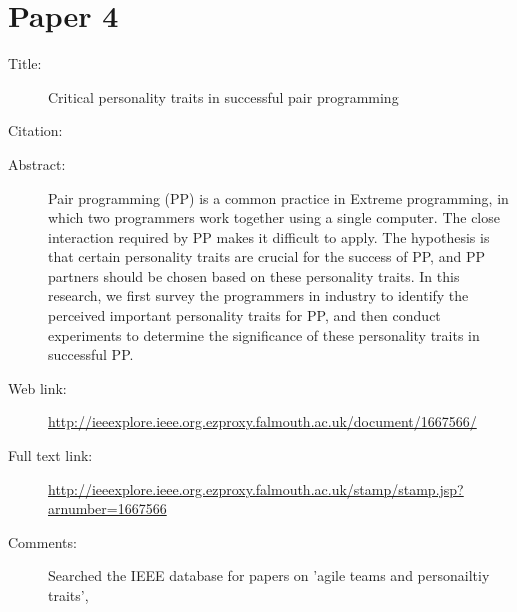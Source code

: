 \documentclass{scrartcl}
\begin{document}
\section*{Paper 4}
\begin{description}
\item[Title:] {Critical personality traits in successful pair programming}
\item[Citation:] \cite{Paper4}
\item[Abstract:]{ Pair programming (PP) is a common practice in Extreme programming, in which two programmers work together using a single computer. The close interaction required by PP makes it difficult to apply. The hypothesis is that certain personality traits are crucial for the success of PP, and PP partners should be chosen based on these personality traits. In this research, we first survey the programmers in industry to identify the perceived important personality traits for PP, and then conduct experiments to determine the significance of these personality traits in successful PP.}
\item[Web link:] \url{http://ieeexplore.ieee.org.ezproxy.falmouth.ac.uk/document/1667566/}
\item[Full text link:] \url{http://ieeexplore.ieee.org.ezproxy.falmouth.ac.uk/stamp/stamp.jsp?arnumber=1667566}
\item[Comments:] Searched the IEEE database for papers on 'agile teams and personailtiy traits', 
\end{description}
\end{document}
